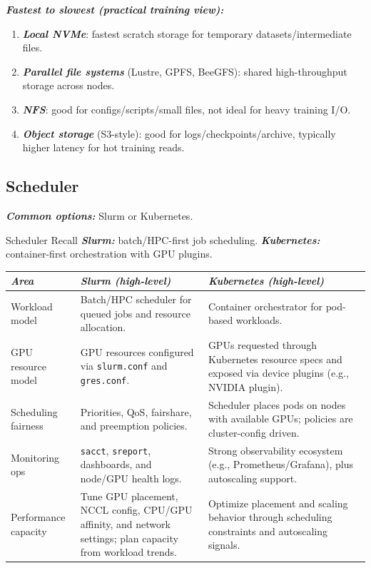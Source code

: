 \documentclass[12pt]{article}
\let\origtextbf\textbf
\renewcommand{\textbf}[1]{\origtextbf{\textit{#1}}}
\begin{document}
\textbf{Fastest to slowest (practical training view):}
\begin{enumerate}[leftmargin=1.4em]
\item \textbf{Local NVMe}: fastest scratch storage for temporary datasets/intermediate files.
\item \textbf{Parallel file systems} (Lustre, GPFS, BeeGFS): shared high-throughput storage across nodes.
\item \textbf{NFS}: good for configs/scripts/small files, not ideal for heavy training I/O.
\item \textbf{Object storage} (S3-style): good for logs/checkpoints/archive, typically higher latency for hot training reads.
\end{enumerate}

\subsection{Scheduler}

\textbf{Common options:} Slurm or Kubernetes.

\begin{bluebox}{Scheduler Recall}
\textbf{Slurm:} batch/HPC-first job scheduling.  
\textbf{Kubernetes:} container-first orchestration with GPU plugins.
\end{bluebox}

{\scriptsize
\setlength{\tabcolsep}{2.6pt}
\begin{tabularx}{0.98\textwidth}{|>{\raggedright\arraybackslash}p{1.5cm}|>{\raggedright\arraybackslash}X|>{\raggedright\arraybackslash}X|}
\hline
\textbf{Area} & \textbf{Slurm (high-level)} & \textbf{Kubernetes (high-level)} \\
\hline
Workload model & Batch/HPC scheduler for queued jobs and resource allocation. & Container orchestrator for pod-based workloads. \\
\hline
GPU resource model & GPU resources configured via \texttt{slurm.conf} and \texttt{gres.conf}. & GPUs requested through Kubernetes resource specs and exposed via device plugins (e.g., NVIDIA plugin). \\
\hline
\shortstack[l]{Scheduling\\fairness} & Priorities, QoS, fairshare, and preemption policies. & Scheduler places pods on nodes with available GPUs; policies are cluster-config driven. \\
\hline
\shortstack[l]{Monitoring\\ops} & \texttt{sacct}, \texttt{sreport}, dashboards, and node/GPU health logs. & Strong observability ecosystem (e.g., Prometheus/Grafana), plus autoscaling support. \\
\hline
\shortstack[l]{Performance\\capacity} & Tune GPU placement, NCCL config, CPU/GPU affinity, and network settings; plan capacity from workload trends. & Optimize placement and scaling behavior through scheduling constraints and autoscaling signals. \\
\hline
\end{tabularx}
}
\end{document}

